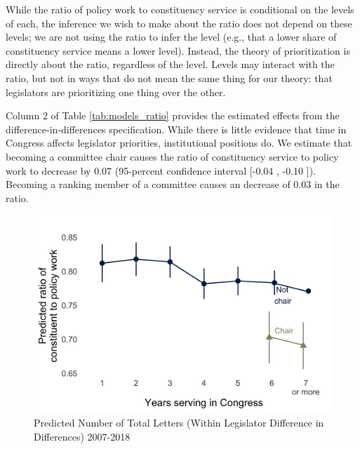\documentclass[12pt]{article}
\begin{document}
While the ratio of policy work to constituency service is conditional on the levels of each, the inference we wish to make about the ratio does not depend on these levels; we are not using the ratio to infer the level (e.g., that a lower share of constituency service means a lower level). Instead, the theory of prioritization is directly about the ratio, regardless of the level. Levels may interact with the ratio, but not in ways that do not mean the same thing for our theory: that legislators are prioritizing one thing over the other. 

Column 2 of Table \ref{tab:models_ratio} provides the estimated effects from the difference-in-differences specification. While there is little evidence that time in Congress affects legislator priorities, institutional positions do. We estimate that becoming a committee chair causes the ratio of constituency service to policy work to decrease by 0.07 (95-percent confidence interval [-0.04 , -0.10 ]). Becoming a ranking member of a committee causes an decrease of 0.03 in the ratio.


\begin{figure}[hbt!]
\centering
\caption{Predicted Number of Total Letters (Within Legislator Difference in Differences) 2007-2018} \label{f:m-ratio-predicted}
\includegraphics[width = .8\textwidth]{figs/m-ratio-predicted-4}
\end{figure}
\end{document}
